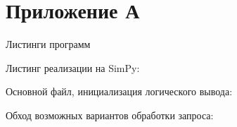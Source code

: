 \chapter*{Приложение А}
\centerline{Листинги программ}

Листинг реализации на SimPy:


Основной файл, инициализация логического вывода:


Обход возможных вариантов обработки запроса:


